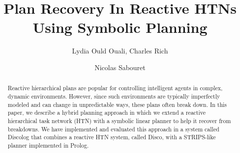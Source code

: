 \documentclass{llncs}
\begin{document}
		\title{Plan Recovery In Reactive HTNs Using Symbolic Planning}
		
		\author{Lydia Ould Ouali, Charles Rich \and
		Nicolas Sabouret  }
		
		
		\maketitle 
		\begin{abstract}
			Reactive hierarchical plans are popular for controlling intelligent agents in complex, dynamic environments.   However, since such environments are typically imperfectly modeled and can change in unpredictable ways, these plans often break down.  In this paper, we describe a hybrid planning approach in which we extend a reactive hierarchical task network (HTN) with a symbolic linear planner to help it recover from breakdowns.  We have implemented and evaluated this approach in a system called Discolog that combines a reactive HTN system, called Disco, with a STRIPS-like planner implemented in Prolog.
					
				
			\end{abstract}
\end{document}
